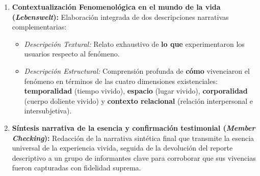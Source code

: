 \begin{enumerate}
    \item \textbf{Contextualización Fenomenológica en el mundo de la vida (\textit{Lebenswelt}):}
    Elaboración integrada de dos descripciones narrativas complementarias:
    \begin{itemize}
        \item \textit{Descripción Textural:} Relato exhaustivo de \textbf{lo que} experimentaron los usuarios respecto al fenómeno.
        \item \textit{Descripción Estructural:} Comprensión profunda de \textbf{cómo} vivenciaron el fenómeno en términos de las cuatro dimensiones existenciales: \textbf{temporalidad} (tiempo vivido), \textbf{espacio} (lugar vivido), \textbf{corporalidad} (cuerpo doliente vivido) y \textbf{contexto relacional} (relación interpersonal e intersubjetiva).
    \end{itemize}
    
    \item \textbf{Síntesis narrativa de la esencia y confirmación testimonial (\textit{Member Checking}):}
    Redacción de la narrativa sintética final que transmite la esencia universal de la experiencia vivida, seguida de la devolución del reporte descriptivo a un grupo de informantes clave para corroborar que sus vivencias fueron capturadas con fidelidad suprema.
\end{enumerate}

\newpage
